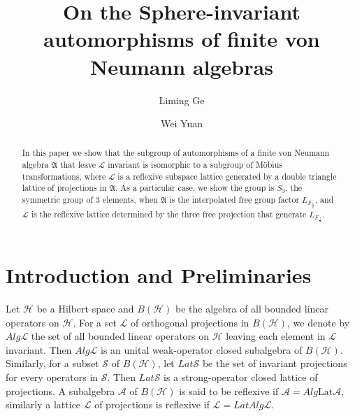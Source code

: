\documentclass{amsart}
\title{On the Sphere-invariant automorphisms of finite von Neumann algebras}
\author{Liming Ge}
\author{Wei Yuan}
\date{}
\newcommand{\AAA}{\mathfrak A}
\newcommand{\HHH}{\mathcal H} %
\newcommand{\LLL}{\mathcal L} %
\newcommand{\Lat}{\mathrm{Lat}}
\begin{document}
\begin{abstract}
In this paper we show that the subgroup of automorphisms of a finite von Neumann algebra $\AAA$ that leave $\LLL$ invariant is  isomorphic to a subgroup of M\"{o}bius transformations,
where $\LLL$ is a reflexive subspace lattice generated by a double triangle lattice of projections in $\AAA$. 
 As a particular case, we show the group is $S_3$, the  symmetric group of 3 elements, when $\AAA $ is the interpolated free group factor $L_{F_{\frac{3}{2}}}$, and 
$\LLL$ is the reflexive lattice determined by the three free projection that generate $L_{F_{\frac{3}{2}}}$. 
\end{abstract}

\maketitle


\section{Introduction and Preliminaries}
Let $\HHH$ be a Hilbert space and $B(\HHH)$ be the algebra of all bounded linear operators on $\HHH$. For a set $\LLL$
of orthogonal projections in $B(\HHH)$, we denote by $Alg\LLL$ the set of all bounded linear operators on $\HHH$ leaving each element
in $\LLL$ invariant. Then $Alg\LLL$ is an unital weak-operator closed subalgebra of $B(\HHH)$. Similarly, for a subset $\mathcal{S}$ of
$B(\HHH)$, let $Lat\mathcal{S}$ be the set of  invariant projections for every operators in $\mathcal{S}$. Then $Lat\mathcal{S}$ is a
strong-operator closed lattice of projections. A subalgebra $\mathcal{A}$ of $B(\HHH)$ is said to be reflexive if
$\mathcal{A}=Alg\Lat\mathcal{A}$, similarly a lattice $\LLL$ of projections is reflexive if $\LLL=LatAlg\LLL$.
\end{document}
